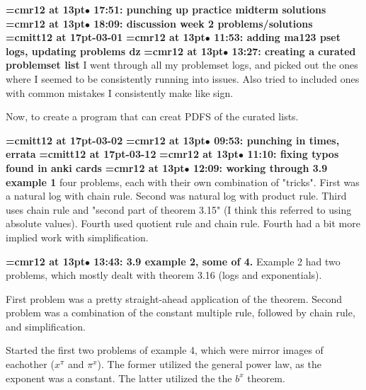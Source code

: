 {\smallskip\noindent\bf\font\titlefont=cmr12 at 13pt\titlefont $\bullet$ 17:51: punching up practice midterm solutions}\smallskip
{\smallskip\noindent\bf\font\titlefont=cmr12 at 13pt\titlefont $\bullet$ 18:09: discussion week 2 problems/solutions}\smallskip
{\medskip\noindent\bf\font\titlefont=cmitt12 at 17pt-03-01}\medskip
{\smallskip\noindent\bf\font\titlefont=cmr12 at 13pt\titlefont $\bullet$ 11:53: adding ma123 pset logs, updating problems dz}\smallskip
{\smallskip\noindent\bf\font\titlefont=cmr12 at 13pt\titlefont $\bullet$ 13:27: creating a curated problemset list}\smallskip
I went through all my problemset logs, and picked out the ones where I seemed to be consistently running into issues. Also tried to included ones with common mistakes I consistently make like sign.
\par

Now, to create a program that can creat PDFS of the curated lists.
\par

{\medskip\noindent\bf\font\titlefont=cmitt12 at 17pt-03-02}\medskip
{\smallskip\noindent\bf\font\titlefont=cmr12 at 13pt\titlefont $\bullet$ 09:53: punching in times, errata}\smallskip
{\medskip\noindent\bf\font\titlefont=cmitt12 at 17pt-03-12}\medskip
{\smallskip\noindent\bf\font\titlefont=cmr12 at 13pt\titlefont $\bullet$ 11:10: fixing typos found in anki cards}\smallskip
{\smallskip\noindent\bf\font\titlefont=cmr12 at 13pt\titlefont $\bullet$ 12:09: working through 3.9 example 1}\smallskip
four problems, each with their own combination of "tricks". First was a natural log with chain rule. Second was natural log with product rule. Third uses chain rule and "second part of theorem 3.15" (I think this referred to using absolute values). Fourth used quotient rule and chain rule. Fourth had a bit more implied work with simplification.
\par

{\smallskip\noindent\bf\font\titlefont=cmr12 at 13pt\titlefont $\bullet$ 13:43: 3.9 example 2, some of 4.}\smallskip
Example 2 had two problems, which mostly dealt with theorem 3.16 (logs and exponentials).
\par

First problem was a pretty straight-ahead application of the theorem. Second problem was a combination of the constant multiple rule, followed by chain rule, and simplification.
\par

Started the first two problems of example 4, which were mirror images of eachother ($x^\pi$ and $\pi^x$). The former utilized the general power law, as the exponent was a constant. The latter utilized the the $b^x$ theorem.
\par

